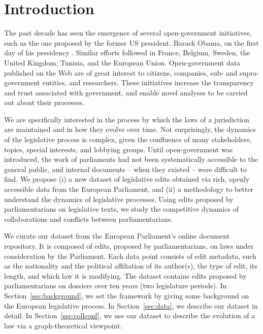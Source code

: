 \section{Introduction}
\label{sec:intro}

The past decade has seen the emergence of several open-government initiatives, such as the one proposed by the former US president, Barack Obama, on the first day of his presidency \cite{open2009barack}.
Similar efforts followed in France, Belgium, Sweden, the United Kingdom, Tunisia, and the European Union.
Open-government data published on the Web are of great interest to citizens, companies, sub- and supra-government entities, and researchers.
These initiatives increase the transparency and trust associated with government, and enable novel analyses to be carried out about their processes.

We are specifically interested in the process by which the laws of a jurisdiction are maintained and in how they evolve over time.
Not surprisingly, the dynamics of the legislative process is complex, given the confluence of many stakeholders, topics, special interests, and lobbying groups.
Until open-government was introduced, the work of parliaments had not been systematically accessible to the general public, and internal documents -- when they existed -- were difficult to find.
We propose (i) a new dataset of legislative edits obtained via rich, openly accessible data from the European Parliament, and (ii) a methodology to better understand the dynamics of legislative processes.
Using edits proposed by parliamentarians on legislative texts, we study the competitive dynamics of collaborations and conflicts between parliamentarians.

We curate our dataset from the European Parliament's online document repository.
It is composed of edits, proposed by parliamentarians, on laws under consideration by the Parliament.
Each data point consists of edit metadata, such as the nationality and the political affiliation of its author(s), the type of edit, its length, and which law it is modifying.
The dataset contains  edits proposed by  parliamentarians on  dossiers over ten years (two legislature periods).
In Section~\ref{sec:background}, we set the framework by giving some background on the European legislative process.
In Section~\ref{sec:data}, we describe our dataset in detail.
In Section~\ref{sec:collconf}, we use our dataset to describe the evolution of a law via a graph-theoretical viewpoint.

